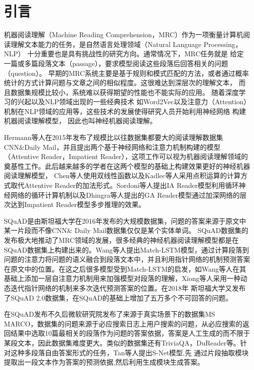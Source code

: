 \section{引言}

机器阅读理解（Machine Reading Comprehension，MRC）作为一项衡量计算机阅读理解文本能力的任务，是自然语言处理领域（Natural Language Processing，NLP）
十分重要也是具有挑战性的研究方向。通常情况下，MRC任务就是
给定一篇或多篇段落文本（passage），要求模型阅读这些段落后回答相关的问题（question）。
早期的MRC系统主要是基于规则和模式匹配的方法，或者通过概率统计的方式计算问题与文章之间的相似程度。这很难达到深层次的理解文本，
而且数据集规模比较小，系统难以获得期望的性能也不能实际的应用。
随着深度学习的兴起以及NLP领域出现的一些经典技术
如Word2Vec以及注意力（Attention）机制在NLP领域的应用等，这些技术的发展使得研究人员开始利用神经网络
构建机器阅读理解模型，
因此也叫神经机器阅读理解。

Hermann等人在2015年发布了规模比以往数据集都要大的阅读理解数据集CNN\&Daily Mail，并且提出两个基于神经网络和注意力机制构建的模型（Attentive Reader，Impatient Reader），这项工作可以视为机器阅读理解领域的奠基性工作。此后越来越多的学者在这两个模型的基础上构建效果更好的神经机器阅读理解模型，
Chen等人使用双线性函数以及Kadlec等人采用点积运算的计算方式取代Attentive Reader的加法形式。Sordoni等人提出IA Reader模型利用循环神经网络的循环计算机制以及Dhingra等人提出的GA Reader模型通过加深网络的层次达到Impatient Reader模型多步推理的效果。

SQuAD是由斯坦福大学在2016年发布的大规模数据集，问题的答案来源于原文中某一片段而不像CNN\& Daily Mail数据集仅仅是某个实体单词。
SQuAD数据集的发布极大地推动了MRC领域的发展，很多经典的神经机器阅读理解模型都是在SQuAD数据集上构建出来的。Wang等人提出Match-LSTM模型，通过计算段落到问题的注意力将问题的语义融合到段落文本中，并且利用指针网络的机制预测答案在原文中的位置。在这之后很多模型受到Match-LSTM的启发，如Wang等人在其基础上添加一层自注意力机制用来加强模型对段落的理解，Xiong等人采用一种动态迭代指针网络的机制来多次迭代预测答案的位置。在2018年
斯坦福大学又发布了SQuAD 2.0数据集，在SQuAD的基础上增加了五万多个不可回答的问题。


在SQuAD发布不久后微软研究院发布了来源于真实场景下的数据集MS MARCO，数据集的问题来源于必应搜索日志上用户搜索的问题，从必应搜索的返回结果中选取10篇最相关的段落作为问题的答案依据，答案是人工生成的而不限于某段文本，因此数据集难度更大。类似的数据集还有TriviaQA，DuReader等。针对这种多段落自由答案形式的任务，Tan等人提出S-Net模型,先
通过片段抽取模块提取出一段文本作为答案的预测依据,然后利用生成模块生成答案。

